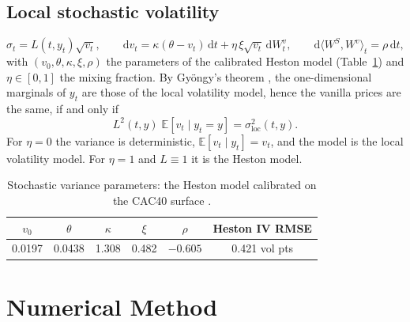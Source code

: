 \documentclass[11pt,a4paper]{article}
\newcommand{\E}{\mathbb{E}}
\newcommand{\dd}{\mathrm{d}}
\newcommand{\sloc}{\sigma_{\mathrm{loc}}}
\begin{document}
\subsection{Local stochastic volatility}
\begin{equation}
\sigma_t = L(t, y_t)\sqrt{v_t}, \qquad \dd v_t = \kappa(\theta - v_t)\,\dd t + \eta\,\xi\sqrt{v_t}\,\dd W^v_t, \qquad
\dd\langle W^S, W^v\rangle_t = \rho\,\dd t,
\end{equation}
with $(v_0, \theta, \kappa, \xi, \rho)$ the parameters of the calibrated Heston model (Table~\ref{tab:heston}) and
$\eta \in [0,1]$ the mixing fraction. By Gyöngy's theorem \cite{gyongy1986}, the one-dimensional marginals of $y_t$
are those of the local volatility model, hence the vanilla prices are the same, if and only if
\begin{equation}\label{eq:gyongy}
L^2(t, y)\; \E[v_t \mid y_t = y] = \sloc^2(t, y).
\end{equation}
For $\eta = 0$ the variance is deterministic, $\E[v_t \mid y_t] = v_t$, and the model is the local volatility model.
For $\eta = 1$ and $L \equiv 1$ it is the Heston model.

\begin{table}[h]
\centering
\begin{tabular}{@{}cccccc@{}}
\toprule
$v_0$ & $\theta$ & $\kappa$ & $\xi$ & $\rho$ & Heston IV RMSE \\
\midrule
0.0197 & 0.0438 & 1.308 & 0.482 & $-0.605$ & 0.421 vol pts \\
\bottomrule
\end{tabular}
\caption{Stochastic variance parameters: the Heston model calibrated on the CAC40 surface \cite{benguedda2026heston}.}
\label{tab:heston}
\end{table}

\section{Numerical Method}\label{sec:method}
\end{document}
